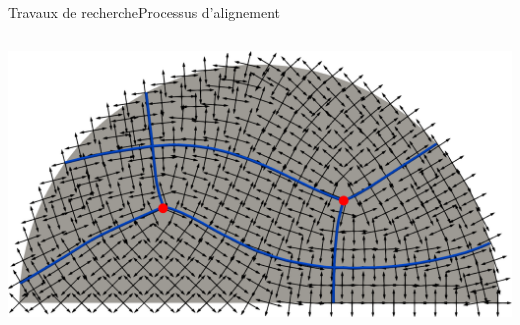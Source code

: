 \documentclass[compress,10pt,aspectratio=169]{beamer}
\begin{document}
\begin{frame}{Travaux de recherche}{Processus d'alignement}
\begin{columns}
\begin{column}{0.32\textwidth}
        \centering
        \includegraphics[scale=0.09]{images/mode_prop_stream_non_align_beam.pdf}
    \end{column}
    \end{columns}
\end{frame}
\end{document}

